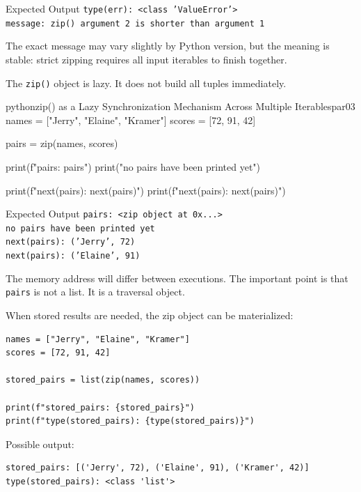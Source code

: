 \documentclass[a4paper,twoside]{report}
\begin{document}
\begin{iobox}{Expected Output}
\texttt{type(err): <class 'ValueError'>} \\
\texttt{message: zip() argument 2 is shorter than argument 1} \\
\end{iobox}


The exact message may vary slightly by Python version, but the meaning is stable: strict zipping requires all input iterables to finish together.

The \texttt{zip()} object is lazy. It does not build all tuples immediately.

\begin{codebox}[]{python}{zip() as a Lazy Synchronization Mechanism Across Multiple Iterables}{par03}
names = ["Jerry", "Elaine", "Kramer"]
scores = [72, 91, 42]

pairs = zip(names, scores)

print(f"pairs: {pairs}")
print("no pairs have been printed yet")

print(f"next(pairs): {next(pairs)}")
print(f"next(pairs): {next(pairs)}")
\end{codebox}


\begin{iobox}{Expected Output}
\texttt{pairs: <zip object at 0x...>} \\
\texttt{no pairs have been printed yet} \\
\texttt{next(pairs): ('Jerry', 72)} \\
\texttt{next(pairs): ('Elaine', 91)} \\
\end{iobox}


The memory address will differ between executions. The important point is that \texttt{pairs} is not a list. It is a traversal object.

When stored results are needed, the zip object can be materialized:

\begin{verbatim}
names = ["Jerry", "Elaine", "Kramer"]
scores = [72, 91, 42]

stored_pairs = list(zip(names, scores))

print(f"stored_pairs: {stored_pairs}")
print(f"type(stored_pairs): {type(stored_pairs)}")
\end{verbatim}

Possible output:

\begin{verbatim}
stored_pairs: [('Jerry', 72), ('Elaine', 91), ('Kramer', 42)]
type(stored_pairs): <class 'list'>
\end{verbatim}
\end{document}
